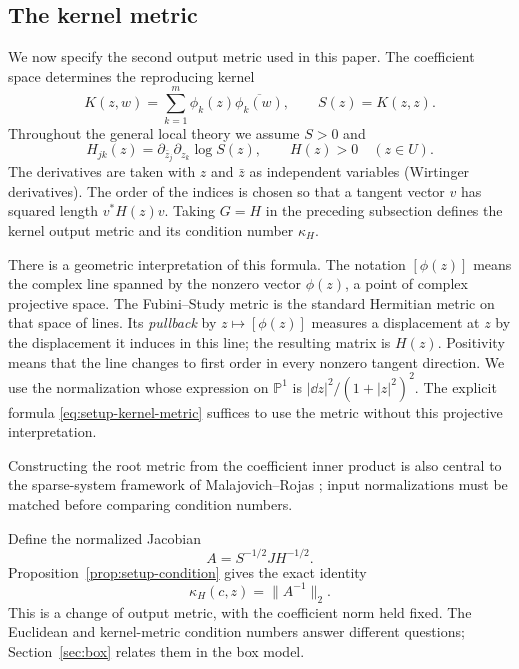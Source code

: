 \subsection{The kernel metric}\label{sec:setup-kernel-metric}

We now specify the second output metric used in this paper. The coefficient
space determines the reproducing kernel
\[
 K(z,w)=\sum_{k=1}^m\phi_k(z)\overline{\phi_k(w)},\qquad S(z)=K(z,z).
\]
Throughout the general local theory we assume $S>0$ and
\begin{equation}\label{eq:setup-kernel-metric}
 H_{jk}(z)=\partial_{\bar z_j}\partial_{z_k}\log S(z),
 \qquad H(z)>0\quad(z\in U).
\end{equation}
The derivatives are taken with $z$ and $\bar z$ as independent variables
(Wirtinger derivatives). The order of the indices is chosen so that a tangent
vector $v$ has squared length $v^*H(z)v$. Taking $G=H$ in the preceding
subsection defines the kernel output metric and its condition number $\kappa_H$.

There is a geometric interpretation of this formula. The notation $[\phi(z)]$
means the complex line spanned by the nonzero vector $\phi(z)$, a point of
complex projective space. The Fubini--Study metric is the standard Hermitian
metric on that space of lines. Its \emph{pullback} by $z\mapsto[\phi(z)]$
measures a displacement at $z$ by the displacement it induces in this line;
the resulting matrix is $H(z)$. Positivity means that the line changes to
first order in every nonzero tangent direction. We use the normalization
whose expression on $\mathbb P^1$ is $|\dd z|^2/(1+|z|^2)^2$.
The explicit formula \eqref{eq:setup-kernel-metric} suffices to use the metric
without this projective interpretation.

Constructing the root metric from the coefficient inner product is also
central to the sparse-system framework of Malajovich--Rojas
\cite[Sections~1--2]{malajovich2004high}; input normalizations must be
matched before comparing condition numbers.

Define the normalized Jacobian
\begin{equation}\label{eq:setup-normalized}
 A=S^{-1/2}JH^{-1/2}.
\end{equation}
Proposition~\ref{prop:setup-condition} gives the exact identity
\begin{equation}\label{eq:setup-kernel-condition}
 \kappa_H(c,z)=\|A^{-1}\|_2.
\end{equation}
This is a change of output metric, with the coefficient norm held fixed.
The Euclidean and kernel-metric condition numbers answer different questions;
Section~\ref{sec:box} relates them in the box model.

